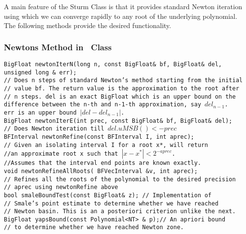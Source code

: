 A main feature of the Sturm Class is that it provides standard
Newton iteration using which we can converge rapidly to any root of the 
underlying polynomial. The following methods provide the desired
functionality.


\subsubsection{Newtons Method in \Sturm\ Class}

\begin{progb}{

\> \tt BigFloat newtonIterN(long n, const BigFloat\& bf, BigFloat\& del,\\
\> \>                        unsigned long \& err);\\
\> \> // Does n steps of standard Newton's method starting from the initial\\
\> \> // value bf. The return value is the approximation to the root after\\
\> \> // n steps. del is an exact BigFloat which is an upper bound on the  \\
\> \> difference between the n-th and n-1-th approximation, say $del_{n-1}$.\\
\> \>  err is an upper bound $|del - del_{n-1}|$.\\
\> \tt BigFloat newtonIterE(int prec, const BigFloat\& bf, BigFloat\& del);\\
\> \> // Does Newton iteration till $del.uMSB() < -prec$\\
\> \tt BFInterval newtonRefine(const BFInterval I, int aprec);\\
\> \> // Given an isolating interval I for a root x*, will return \\
\> \> //an approximate root x such that $|x-x^*| < 2^{-aprec}$.\\
\> \> //Assumes that the interval end points are known exactly.\\
\> \tt void newtonRefineAllRoots( BFVecInterval \&v, int aprec);\\
\> \> // Refines all the roots of the polynomial to the desired precision\\
\> \> // aprec using newtonRefine above\\
\> \tt   bool smaleBoundTest(const BigFloat\& z); // Implementation of \\
\> \> // Smale's point estimate to determine whether we have reached \\
\> \> // Newton basin. This is an a posteriori criterion unlike the next.\\
\> \tt   BigFloat yapsBound(const Polynomial<NT> \& p);// An apriori bound\\
\> \> // to determine whether we have reached Newton zone.\\

}\end{progb}


